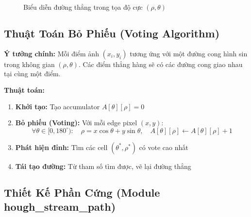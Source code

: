 \documentclass[12pt,a4paper]{article}
\begin{document}
\begin{figure}[H]
\centering
{}
\caption{Biểu diễn đường thẳng trong tọa độ cực $(\rho, \theta)$}
\label{fig:hough_param}
\end{figure}

\subsection{Thuật Toán Bỏ Phiếu (Voting Algorithm)}

\textbf{Ý tưởng chính:} Mỗi điểm ảnh $(x_i, y_i)$ tương ứng với một đường cong hình sin trong không gian $(\rho, \theta)$. Các điểm thẳng hàng sẽ có các đường cong giao nhau tại cùng một điểm.

\textbf{Thuật toán:}
\begin{enumerate}
    \item \textbf{Khởi tạo:} Tạo accumulator $A[\theta][\rho] = 0$
    \item \textbf{Bỏ phiếu (Voting):} Với mỗi edge pixel $(x, y)$:
    \begin{equation}
        \forall \theta \in [0, 180^\circ): \quad \rho = x\cos\theta + y\sin\theta, \quad A[\theta][\rho] \leftarrow A[\theta][\rho] + 1
    \end{equation}
    \item \textbf{Phát hiện đỉnh:} Tìm các cell $(\theta^*, \rho^*)$ có vote cao nhất
    \item \textbf{Tái tạo đường:} Từ tham số tìm được, vẽ lại đường thẳng
\end{enumerate}

\subsection{Thiết Kế Phần Cứng (Module hough\_stream\_path)}
\end{document}
